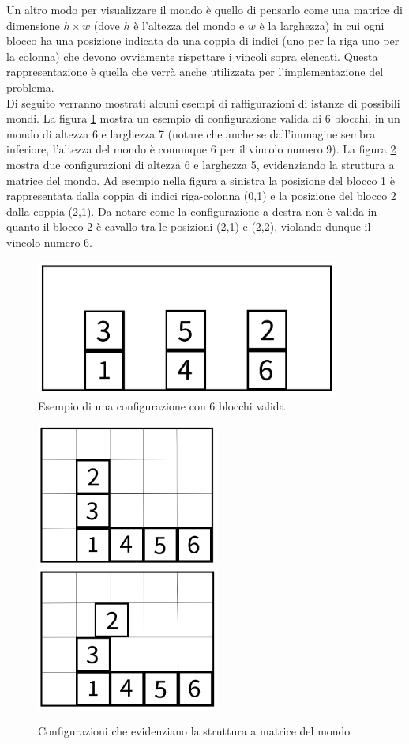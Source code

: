 \documentclass{article}
\begin{document}
	Un altro modo per visualizzare il mondo è quello di pensarlo come una matrice di dimensione $h \times w$ (dove $h$ è l'altezza del mondo e $w$ è la larghezza) in cui ogni blocco ha una posizione indicata da una coppia di indici (uno per la riga uno per la colonna) che devono ovviamente rispettare i vincoli sopra elencati. Questa rappresentazione è quella che verrà anche utilizzata per l'implementazione del problema.\\
	Di seguito verranno mostrati alcuni esempi di raffigurazioni di istanze di possibili mondi. La figura \ref{fig:valid} mostra un esempio di configurazione valida di 6 blocchi, in un mondo di altezza 6 e larghezza 7 (notare che anche se dall'immagine sembra inferiore, l'altezza del mondo è comunque 6 per il vincolo numero 9). La figura \ref{fig:matrix} mostra due configurazioni di altezza 6 e larghezza 5, evidenziando la struttura a matrice del mondo. Ad esempio nella figura a sinistra la posizione del blocco 1 è rappresentata dalla coppia di indici riga-colonna (0,1) e la posizione del blocco 2 dalla coppia (2,1). Da notare come la configurazione a destra non è valida in quanto il blocco 2 è cavallo tra le posizioni (2,1) e (2,2), violando dunque il vincolo numero 6.
	\begin{figure}[H]
	\centering
	\includegraphics[width=10cm]{./images/valid.png}
	\caption{Esempio di una configurazione con 6 blocchi valida}
	\label{fig:valid}
	\end{figure}
	\begin{figure}[H]
	\centering
	\includegraphics[width=6cm]{./images/valid-grid.png}
	\includegraphics[width=6cm]{./images/non-valid-grid.png}
	\caption{Configurazioni che evidenziano la struttura a matrice del mondo}
	\label{fig:matrix}
	\end{figure}
\end{document}
